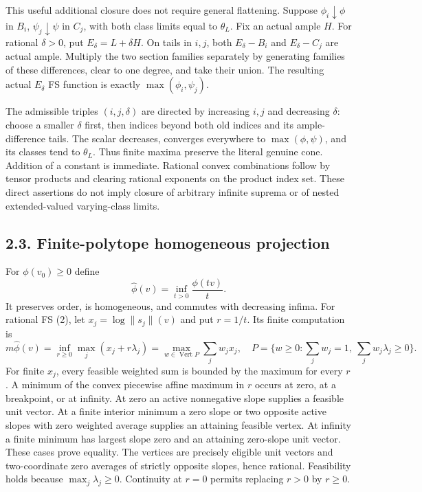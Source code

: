 \documentclass[
  10pt,
]{article}
\begin{document}
This useful additional closure does not require general flattening.
Suppose \(\phi_i\downarrow\phi\) in \(B_i\), \(\psi_j\downarrow\psi\) in
\(C_j\), with both class limits equal to \(\theta_L\). Fix an actual
ample \(H\). For rational \(\delta>0\), put \(E_\delta=L+\delta H\). On
tails in \(i,j\), both \(E_\delta-B_i\) and \(E_\delta-C_j\) are actual
ample. Multiply the two section families separately by generating
families of these differences, clear to one degree, and take their
union. The resulting actual \(E_\delta\) FS function is exactly
\(\max(\phi_i,\psi_j)\).

The admissible triples \((i,j,\delta)\) are directed by increasing
\(i,j\) and decreasing \(\delta\): choose a smaller \(\delta\) first,
then indices beyond both old indices and its ample-difference tails. The
scalar decreases, converges everywhere to \(\max(\phi,\psi)\), and its
classes tend to \(\theta_L\). Thus finite maxima preserve the literal
genuine cone. Addition of a constant is immediate. Rational convex
combinations follow by tensor products and clearing rational exponents
on the product index set. These direct assertions do not imply closure
of arbitrary infinite suprema or of nested extended-valued varying-class
limits.

\subsection{2.3. Finite-polytope homogeneous
projection}\label{finite-polytope-homogeneous-projection}

For \(\phi(v_0)\geq0\) define
\[\widehat\phi(v)=\inf_{t>0}\frac{\phi(tv)}t.\tag{9}\] It preserves
order, is homogeneous, and commutes with decreasing infima. For rational
FS (2), let \(x_j=\log\|s_j\|(v)\) and put \(r=1/t\). Its finite
computation is \[m\widehat\phi(v)=\inf_{r\geq0}\max_j(x_j+r\lambda_j)
=\max_{w\in\operatorname{Vert} P}\sum_jw_jx_j,
\quad P=\{w\geq0:\sum_jw_j=1,\ \sum_jw_j\lambda_j\geq0\}.\tag{10}\] For
finite \(x_j\), every feasible weighted sum is bounded by the maximum
for every \(r\). A minimum of the convex piecewise affine maximum in
\(r\) occurs at zero, at a breakpoint, or at infinity. At zero an active
nonnegative slope supplies a feasible unit vector. At a finite interior
minimum a zero slope or two opposite active slopes with zero weighted
average supplies an attaining feasible vertex. At infinity a finite
minimum has largest slope zero and an attaining zero-slope unit vector.
These cases prove equality. The vertices are precisely eligible unit
vectors and two-coordinate zero averages of strictly opposite slopes,
hence rational. Feasibility holds because \(\max_j\lambda_j\geq0\).
Continuity at \(r=0\) permits replacing \(r>0\) by \(r\geq0\).
\end{document}
